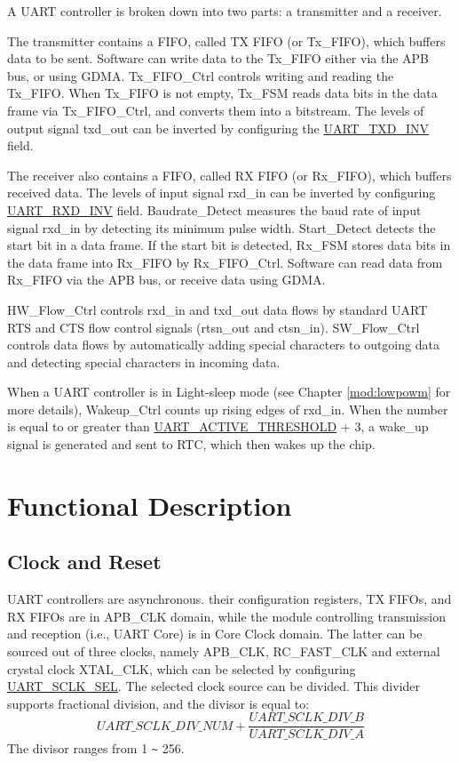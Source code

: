 \documentclass[main\_\_EN.tex]{subfiles}
\begin{document}
A UART controller is broken down into two parts: a transmitter and a receiver.

The transmitter contains a FIFO, called TX FIFO (or Tx\_FIFO), which buffers data to be sent. Software can write data to the Tx\_FIFO either via the APB bus, or using GDMA. Tx\_FIFO\_Ctrl controls writing and reading the Tx\_FIFO. When Tx\_FIFO is not empty, Tx\_FSM reads data bits in the data frame via Tx\_FIFO\_Ctrl, and converts them into a bitstream. The levels of output signal txd\_out can be inverted by configuring the \hyperref[fielddesc:UARTTXDINV]{UART\_TXD\_INV} field.

The receiver also contains a FIFO, called RX FIFO (or Rx\_FIFO), which buffers received data. The levels of input signal rxd\_in can be inverted by configuring \hyperref[fielddesc:UARTRXDINV]{UART\_RXD\_INV} field. Baudrate\_Detect measures the baud rate of input signal rxd\_in by detecting its minimum pulse width. Start\_Detect detects the start bit in a data frame. If the start bit is detected, Rx\_FSM stores data bits in the data frame into Rx\_FIFO by Rx\_FIFO\_Ctrl. Software can read data from Rx\_FIFO via the APB bus, or receive data using GDMA.

HW\_Flow\_Ctrl controls rxd\_in and txd\_out data flows by standard UART RTS and CTS flow control signals (rtsn\_out and ctsn\_in). SW\_Flow\_Ctrl controls data flows by automatically adding special characters to outgoing data and detecting special characters in incoming data.

When a UART controller is in Light-sleep mode (see Chapter \ref{mod:lowpowm} \textit{} for more details), Wakeup\_Ctrl counts up rising edges of rxd\_in. When the number is equal to or greater than \hyperref[fielddesc:UARTACTIVETHRESHOLD]{UART\_ACTIVE\_THRESHOLD} + 3, a wake\_up signal is generated and sent to RTC, which then wakes up the \chipname{}  chip.

\section{Functional Description}

\subsection{Clock and Reset}

UART controllers are asynchronous. their configuration registers, TX FIFOs, and RX FIFOs are in APB\_CLK domain, while the module controlling transmission and reception (i.e., UART Core) is in Core Clock domain. The latter can be sourced out of three clocks, namely APB\_CLK, RC\_FAST\_CLK and external crystal clock XTAL\_CLK, which can be selected by configuring \hyperref[fielddesc:UARTSCLKSEL]{UART\_SCLK\_SEL}. The selected clock source can be divided. This divider supports fractional division, and the divisor is equal to:
\[
\hyperref[fielddesc:UARTSCLKDIVNUM]{UART\_SCLK\_DIV\_NUM} + \frac{\hyperref[fielddesc:UARTSCLKDIVB]{UART\_SCLK\_DIV\_B}}{\hyperref[fielddesc:UARTSCLKDIVA]{UART\_SCLK\_DIV\_A}}
\]
The divisor ranges from 1 \verb+~+ 256.
\end{document}
